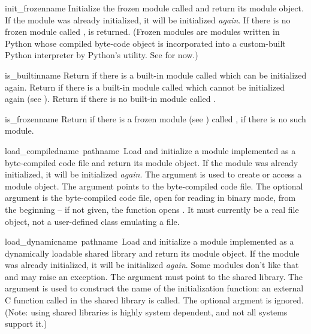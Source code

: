 \begin{funcdesc}{init_frozen}{name}
Initialize the frozen module called  and return its module
object.  If the module was already initialized, it will be initialized
{\em again}.  If there is no frozen module called ,
 is returned.  (Frozen modules are modules written in
Python whose compiled byte-code object is incorporated into a
custom-built Python interpreter by Python's  utility.
See  for now.)
\end{funcdesc}

\begin{funcdesc}{is_builtin}{name}
Return  if there is a built-in module called  which can be
initialized again.  Return  if there is a built-in module
called  which cannot be initialized again (see
).  Return  if there is no built-in module
called .
\end{funcdesc}

\begin{funcdesc}{is_frozen}{name}
Return  if there is a frozen module (see )
called ,  if there is no such module.
\end{funcdesc}

\begin{funcdesc}{load_compiled}{name\, pathname\, }
Load and initialize a module implemented as a byte-compiled code file
and return its module object.  If the module was already initialized,
it will be initialized {\em again}.  The  argument is used
to create or access a module object.  The  argument
points to the byte-compiled code file.  The optional 
argument is the byte-compiled code file, open for reading in binary
mode, from the beginning -- if not given, the function opens
.  It must currently be a real file object, not a
user-defined class emulating a file.
\end{funcdesc}

\begin{funcdesc}{load_dynamic}{name\, pathname\, }
Load and initialize a module implemented as a dynamically loadable
shared library and return its module object.  If the module was
already initialized, it will be initialized {\em again}.  Some modules
don't like that and may raise an exception.  The 
argument must point to the shared library.  The  argument is
used to construct the name of the initialization function: an external
C function called  in the shared library is
called.  The optional  argment is ignored.  (Note: using
shared libraries is highly system dependent, and not all systems
support it.)
\end{funcdesc}

